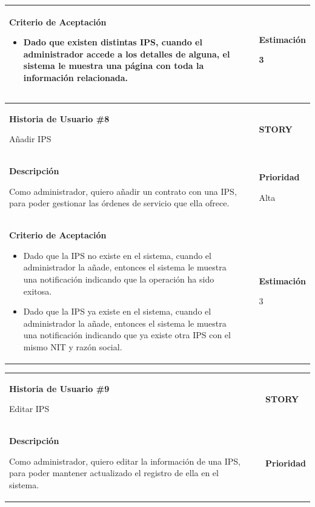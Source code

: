 \documentclass[12pt,a4paper]{article}
\begin{document}
\begin{center}
\begin{tabular}{| p{10cm} c p{2.5cm}|}
\textbf{Criterio de Aceptación}

\begin{itemize}
\item Dado que existen distintas IPS, cuando el administrador accede a
los detalles de alguna, el sistema le muestra una página con toda
la información relacionada.
\end{itemize} & & \textbf{Estimación}

3 \\ 
\hline 
\end{tabular}
\vspace{5mm}

\begin{tabular}{| p{10cm} c p{2.5cm}|}
\hline 
\textbf{Historia de Usuario \#8}

Añadir IPS & & \textbf{{\Large STORY}} \\ 
\textbf{Descripción}

Como administrador, quiero añadir un contrato con una IPS, para poder
gestionar las órdenes de servicio que ella ofrece. &  & \textbf{Prioridad}

Alta\\

\textbf{Criterio de Aceptación}

\begin{itemize}
\item Dado que la IPS no existe en el sistema, cuando el administrador
la añade, entonces el sistema le muestra una notificación
indicando que la operación ha sido exitosa.
\item Dado que la IPS ya existe en el sistema, cuando el administrador
la añade, entonces el sistema le muestra una notificación
indicando que ya existe otra IPS con el mismo NIT y razón social.
\end{itemize} & & \textbf{Estimación}

3 \\ 
\hline 
\end{tabular}
\vspace{5mm}

\begin{tabular}{| p{10cm} c p{2.5cm}|}
\hline 
\textbf{Historia de Usuario \#9}

Editar IPS & & \textbf{{\Large STORY}} \\ 
\textbf{Descripción}

Como administrador, quiero editar la información de una IPS, para poder
mantener actualizado el registro de ella en el sistema. &  & \textbf{Prioridad}


\end{tabular}
\end{center}
\end{document}
